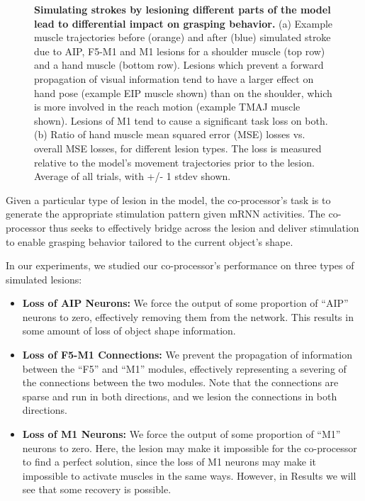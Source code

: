 \documentclass[12pt]{iopart}
\begin{document}
\begin{figure}[h]
\begin{subfigure}[c]{0.32\textwidth}
	\end{subfigure}
	\hfill
	\caption{\textbf{Simulating strokes by lesioning different parts of the model 
	         lead to differential impact on grasping behavior.}
             (a) Example muscle trajectories before (orange) and after (blue)
             simulated stroke due to AIP, F5-M1 and M1 lesions for a shoulder
             muscle (top row) and a hand muscle (bottom row). Lesions which prevent
             a forward propagation of visual information tend to have a larger effect
             on hand pose (example EIP muscle shown) than on the shoulder, which is more
             involved in the reach motion (example TMAJ muscle shown). Lesions of M1
             tend to cause a significant task loss on both.
             (b) Ratio of hand muscle mean squared error (MSE) losses vs.
             overall MSE losses, for different lesion types. The loss is measured
             relative to the model's movement trajectories prior to the lesion.
             Average of all trials, with +/- 1 stdev shown.}
	\label{fig:lesion}
\end{figure}

Given a particular type of lesion in the model, the co-processor's task is to
generate the appropriate stimulation pattern given mRNN activities. The
co-processor thus seeks to effectively bridge across the lesion and deliver
stimulation to enable grasping behavior tailored to the current object's shape.

In our experiments, we studied our co-processor's performance on three types of
simulated lesions:
\begin{itemize}
	\item \textbf{Loss of AIP Neurons:} We force the output of some proportion of ``AIP''
	      neurons to zero, effectively removing them from the network. This results in some amount of 
	      loss of object shape information.
	\item \textbf{Loss of F5-M1 Connections:} We prevent the propagation of
	      information between the ``F5'' and ``M1'' modules, effectively representing a
	      severing of the connections between the two modules. Note that the connections are sparse
	      and run in both directions, and we lesion the connections in both directions.
	\item \textbf{Loss of M1 Neurons:} We force the output of some proportion of ``M1''
	      neurons to zero. Here, the lesion may make it impossible for the co-processor
	      to find a perfect solution, since the loss of M1 neurons may make it impossible to
	      activate muscles in the same ways. However, in Results we will see that some recovery
	      is possible.
\end{itemize}
\end{document}
